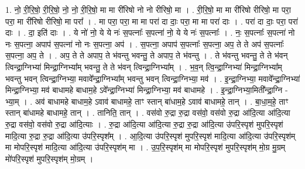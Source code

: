 \documentclass[17pt]{extarticle}
\begin{document}
1. नो॒ री॒रि॒षो॒ री॒रि॒षो॒ नो॒ नो॒ री॒रि॒षो॒ मा मा री॑रिषो नो नो रीरिषो॒ मा । . री॒रि॒षो॒ मा मा री॑रिषो रीरिषो॒ मा परा॒ परा॒ मा री॑रिषो रीरिषो॒ मा परा᳚ । . मा परा॒ परा॒ मा मा परा॑ दा दाः॒ परा॒ मा मा परा॑ दाः । . परा॑ दा दाः॒ परा॒ परा॑ दाः । . दा॒ इति॑ दाः । . ये नो॑ नो॒ ये ये नः॑ स॒पत्नाः᳚ स॒पत्ना॑ नो॒ ये ये नः॑ स॒पत्नाः᳚ । . नः॒ स॒पत्नाः᳚ स॒पत्ना॑ नो नः स॒पत्ना॒ अपाप॑ स॒पत्ना॑ नो नः स॒पत्ना॒ अप॑ । . स॒पत्ना॒ अपाप॑ स॒पत्नाः᳚ स॒पत्ना॒ अप॒ ते ते अप॑ स॒पत्नाः᳚ स॒पत्ना॒ अप॒ ते । . अप॒ ते ते अपाप॒ ते भ॑वन्तु भवन्तु॒ ते अपाप॒ ते भ॑वन्तु । . ते भ॑वन्तु भवन्तु॒ ते ते भ॑वन् त्विन्द्रा॒ग्निभ्या॑ मिन्द्रा॒ग्निभ्या᳚म् भवन्तु॒ ते ते भ॑वन् त्विन्द्रा॒ग्निभ्या᳚म् । . भ॒व॒न् त्वि॒न्द्रा॒ग्निभ्या॑ मिन्द्रा॒ग्निभ्या᳚म् भवन्तु भवन् त्विन्द्रा॒ग्निभ्या॒ मवावे᳚न्द्रा॒ग्निभ्या᳚म् भवन्तु भवन् त्विन्द्रा॒ग्निभ्या॒ मव॑ । . इ॒न्द्रा॒ग्निभ्या॒ मवावे᳚न्द्रा॒ग्निभ्या॑ मिन्द्रा॒ग्निभ्या॒ मव॑ बाधामहे बाधाम॒हे ऽवे᳚न्द्रा॒ग्निभ्या॑ मिन्द्रा॒ग्निभ्या॒ मव॑ बाधामहे । . इ॒न्द्रा॒ग्निभ्या॒मिती᳚न्द्रा॒ग्नि - भ्या॒म् । . अव॑ बाधामहे बाधाम॒हे ऽवाव॑ बाधामहे॒ ताꣳ स्तान् बा॑धाम॒हे ऽवाव॑ बाधामहे॒ तान् । . बा॒धा॒म॒हे॒ ताꣳ स्तान् बा॑धामहे बाधामहे॒ तान् । . तानिति॒ तान् । . वस॑वो रु॒द्रा रु॒द्रा वस॑वो॒ वस॑वो रु॒द्रा आ॑दि॒त्या आ॑दि॒त्या रु॒द्रा वस॑वो॒ वस॑वो रु॒द्रा आ॑दि॒त्याः । . रु॒द्रा आ॑दि॒त्या आ॑दि॒त्या रु॒द्रा रु॒द्रा आ॑दि॒त्या उ॑परि॒स्पृश॑ मुपरि॒स्पृश॑ मादि॒त्या रु॒द्रा रु॒द्रा आ॑दि॒त्या उ॑परि॒स्पृश᳚म् । . आ॒दि॒त्या उ॑परि॒स्पृश॑ मुपरि॒स्पृश॑ मादि॒त्या आ॑दि॒त्या उ॑परि॒स्पृश॑म् मा मोपरि॒स्पृश॑ मादि॒त्या आ॑दि॒त्या उ॑परि॒स्पृश॑म् मा । . उ॒प॒रि॒स्पृश॑म् मा मोपरि॒स्पृश॑ मुपरि॒स्पृश॑म् मो॒ग्र मु॒ग्रम् मो॑परि॒स्पृश॑ मुपरि॒स्पृश॑म् मो॒ग्रम् । \newline
\end{document}
